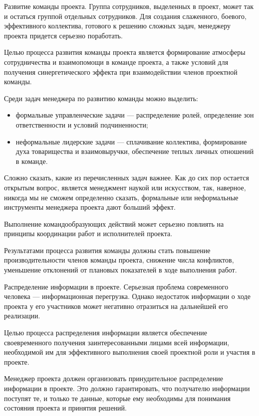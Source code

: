 Развитие команды проекта.
Группа сотрудников, выделенных в проект, может так и остаться группой отдельных сотрудников.
Для создания слаженного, боевого, эффективного коллектива, готового к решению сложных задач, ме­неджеру проекта придется серьезно поработать.

Целью процесса развития команды проекта является формирова­ние атмосферы сотрудничества и взаимопомощи в команде проекта, а также условий для получения синергетического эффекта при взаимо­действии членов проектной команды.

Среди задач менеджера по развитию команды можно выделить:
\begin{itemize}
	\item формальные управленческие задачи --- распределение ролей, опре­деление зон ответственности и условий подчиненности;
	\item неформальные лидерские задачи --- сплачивание коллектива, фор­мирование духа товарищества и взаимовыручки, обеспечение теп­лых личных отношений в команде.
\end{itemize}

Сложно сказать, какие из перечисленных задач важнее.
Как до сих пор остается открытым вопрос, является менеджмент наукой или искусством, так, наверное, никогда мы не сможем определенно ска­зать, формальные или неформальные инструменты менеджера проек­та дают больший эффект.

Выполнение командообразующих действий может серьезно повлиять на принципы координации работ и исполнителей проекта.

Результатами процесса развития команды должны стать повышение производительности членов команды проекта, снижение числа кон­фликтов, уменьшение отклонений от плановых показателей в ходе выполнения работ.

Распределение информации в проекте.
Серьезная проблема современного человека --- информационная пере­грузка.
Однако недостаток информации о ходе проекта у его участни­ков может негативно отразиться на дальнейшей его реализации.

Целью процесса распределения информации является обеспечение своевременного получения заинтересованными лицами всей информа­ции, необходимой им для эффективного выполнения своей проектной роли и участия в проекте.

Менеджер проекта должен организовать принудительное распре­деление информации в проекте.
Это должно гарантировать, что по­лучателю информации поступят те, и только те данные, которые ему необходимы для понимания состояния проекта и принятия решений.

